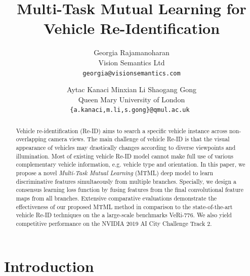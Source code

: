 \documentclass[10pt,twocolumn,letterpaper]{article}
\begin{document}
\title{Multi-Task Mutual Learning for Vehicle Re-Identification}

\author{Georgia Rajamanoharan\\
Vision Semantics Ltd\\
{\tt\small georgia@visionsemantics.com}
\and
Aytac Kanaci \hspace{0.7cm}
Minxian Li  \hspace{0.7cm}
Shaogang Gong\\
Queen Mary University of London\\
{\tt\small \{a.kanaci,m.li,s.gong\}@qmul.ac.uk }
}

\maketitle

\begin{abstract}
Vehicle re-identification (Re-ID) aims to search a specific vehicle
instance across non-overlapping camera views.
%
The main challenge of vehicle Re-ID is that
the visual appearance of vehicles may drastically changes
according to diverse viewpoints and illumination.
%
Most of existing vehicle Re-ID model cannot make full use of
various complementary vehicle information, e.g. vehicle type and orientation.
%
In this paper, we propose a novel {\em Multi-Task Mutual Learning} (MTML) deep model
to learn discriminative features simultaeously from multiple branches.
%
Specially, we design a consensus learning loss function by fusing features from the final convolutional feature maps from all branches.
%
Extensive comparative evaluations demonstrate the effectiveness of our
proposed MTML method in comparison to the state-of-the-art vehicle Re-ID techniques on the a large-scale benchmarks VeRi-776.
We also yield competitive performance on the NVIDIA 2019 AI City Challenge Track 2.
\end{abstract}

\section{Introduction}
\end{document}
